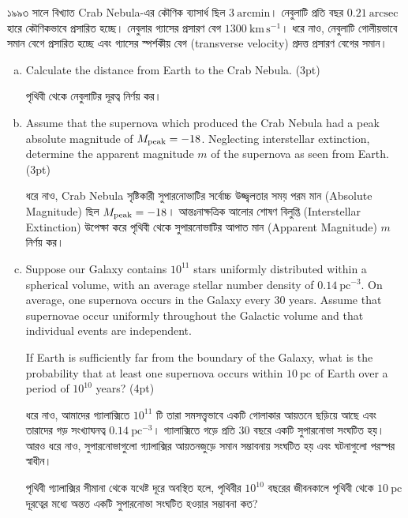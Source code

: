 \documentclass[10pt,a5paper,twoside]{article}
\newcommand{\m}[1]{%
	\unskip\nobreak\hfill
	\mbox{\normalfont(#1pt)}%
}
\begin{document}
১৯৯৩ সালে বিখ্যাত Crab Nebula-এর কৌণিক ব্যাসার্ধ ছিল $3~\mathrm{arcmin}$। নেবুলাটি প্রতি বছর $0.21~\mathrm{arcsec}$ হারে কৌণিকভাবে প্রসারিত হচ্ছে। নেবুলার গ্যাসের প্রসারণ বেগ $1300~\mathrm{km\,s^{-1}}$। ধরে নাও, নেবুলাটি গোলীয়ভাবে সমান বেগে প্রসারিত হচ্ছে এবং গ্যাসের স্পর্শকীয় বেগ (transverse velocity) প্রদত্ত প্রসারণ বেগের সমান।

\begin{enumerate}[a.]
	
	\item Calculate the distance from Earth to the Crab Nebula. \m{3}
	
	পৃথিবী থেকে নেবুলাটির দূরত্ব নির্ণয় কর।
	
	\item Assume that the supernova which produced the Crab Nebula had a peak absolute magnitude of $M_{\rm peak}=-18$. Neglecting interstellar extinction, determine the apparent magnitude $m$ of the supernova as seen from Earth. \m{3}
	
	ধরে নাও, Crab Nebula সৃষ্টিকারী সুপারনোভাটির সর্বোচ্চ উজ্জ্বলতার সময় পরম মান (Absolute Magnitude) ছিল $M_{\rm peak}=-18$। আন্তঃনাক্ষত্রিক আলোর শোষণ বিলুপ্তি (Interstellar Extinction) উপেক্ষা করে পৃথিবী থেকে সুপারনোভাটির আপাত মান (Apparent Magnitude) $m$ নির্ণয় কর।
	
	\item Suppose our Galaxy contains $10^{11}$ stars uniformly distributed within a spherical volume, with an average stellar number density of $0.14~\mathrm{pc^{-3}}$. On average, one supernova occurs in the Galaxy every $30$ years. Assume that supernovae occur uniformly throughout the Galactic volume and that individual events are independent.
	
	If Earth is sufficiently far from the boundary of the Galaxy, what is the probability that at least one supernova occurs within $10~\mathrm{pc}$ of Earth over a period of $10^{10}$ years? \m{4}
	
	ধরে নাও, আমাদের গ্যালাক্সিতে $10^{11}$ টি তারা সমসত্ত্বভাবে একটি গোলাকার আয়তনে ছড়িয়ে আছে এবং তারাদের গড় সংখ্যাঘনত্ব $0.14~\mathrm{pc^{-3}}$। গ্যালাক্সিতে গড়ে প্রতি $30$ বছরে একটি সুপারনোভা সংঘটিত হয়। আরও ধরে নাও, সুপারনোভাগুলো গ্যালাক্সির আয়তনজুড়ে সমান সম্ভাবনায় সংঘটিত হয় এবং ঘটনাগুলো পরস্পর স্বাধীন।
	
	পৃথিবী গ্যালাক্সির সীমানা থেকে যথেষ্ট দূরে অবস্থিত হলে, পৃথিবীর $10^{10}$ বছরের জীবনকালে পৃথিবী থেকে $10~\mathrm{pc}$ দূরত্বের মধ্যে অন্তত একটি সুপারনোভা সংঘটিত হওয়ার সম্ভাবনা কত?
	
\end{enumerate}
\end{document}

